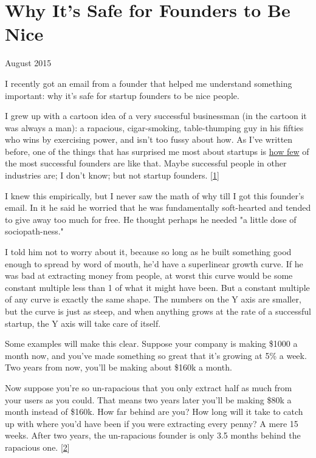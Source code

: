 \chapter{Why It's Safe for Founders to Be Nice}



August 2015

I recently got an email from a founder that helped me understand
something important: why it's safe for startup founders to be nice
people.

I grew up with a cartoon idea of a very successful businessman (in
the cartoon it was always a man): a rapacious, cigar-smoking,
table-thumping guy in his fifties who wins by exercising power, and
isn't too fussy about how.  As I've written before, one of
the things that has surprised me most about startups is 
\href{http://www.paulgraham.com/mean.html}{how few} of
the most successful founders are like that.  Maybe successful people
in other industries are; I don't know; but not startup founders.
[\href{\#f1n}{1}]

I knew this empirically, but I never saw the math of why till I got
this founder's email.  In it he said he worried that he was
fundamentally soft-hearted and tended to give away too much for
free. He thought perhaps he needed "a little dose of sociopath-ness."

I told him not to worry about it, because so long as he built
something good enough to spread by word of mouth, he'd have a
superlinear growth curve.  If he was bad at extracting money from
people, at worst this curve would be some constant multiple less
than 1 of what it might have been.  But a constant multiple of any
curve is exactly the same shape.  The numbers on the Y axis are
smaller, but the curve is just as steep, and when anything grows
at the rate of a successful startup, the Y axis will take care of
itself.

Some examples will make this clear.  Suppose your company is making
\$1000 a month now, and you've made something so great that it's
growing at 5\% a week.  Two years from now, you'll be making about
\$160k a month.

Now suppose you're so un-rapacious that you only extract half as
much from your users as you could.  That means two years later
you'll be making \$80k a month instead of \$160k.  How far behind are
you? How long will it take to catch up with where you'd have been
if you were extracting every penny?  A mere 15 weeks.  After two
years, the un-rapacious founder is only 3.5 months behind the
rapacious one. 
[\href{\#f2n}{2}]

